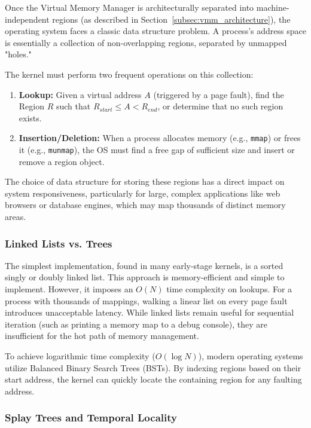 \documentclass[a4paper,10pt,twoside]{report}
\theoremstyle{definition}
\begin{document}
Once the Virtual Memory Manager is architecturally separated into machine-independent regions (as described in Section~\ref{subsec:vmm_architecture}), the operating system faces a classic data structure problem. A process's address space is essentially a collection of non-overlapping regions, separated by unmapped "holes."

The kernel must perform two frequent operations on this collection:
\begin{enumerate}
    \item \textbf{Lookup:} Given a virtual address $A$ (triggered by a page fault), find the Region $R$ such that $R_{start} \le A < R_{end}$, or determine that no such region exists.
    \item \textbf{Insertion/Deletion:} When a process allocates memory (e.g., \texttt{mmap}) or frees it (e.g., \texttt{munmap}), the OS must find a free gap of sufficient size and insert or remove a region object.
\end{enumerate}

The choice of data structure for storing these regions has a direct impact on system responsiveness, particularly for large, complex applications like web browsers or database engines, which may map thousands of distinct memory areas.

\subsubsection{Linked Lists vs. Trees}

The simplest implementation, found in many early-stage kernels, is a sorted singly or doubly linked list. This approach is memory-efficient and simple to implement. However, it imposes an $O(N)$ time complexity on lookups. For a process with thousands of mappings, walking a linear list on every page fault introduces unacceptable latency. While linked lists remain useful for sequential iteration (such as printing a memory map to a debug console), they are insufficient for the hot path of memory management.

To achieve logarithmic time complexity ($O(\log N)$), modern operating systems utilize Balanced Binary Search Trees (BSTs). By indexing regions based on their start address, the kernel can quickly locate the containing region for any faulting address.

\subsubsection{Splay Trees and Temporal Locality}
\end{document}
